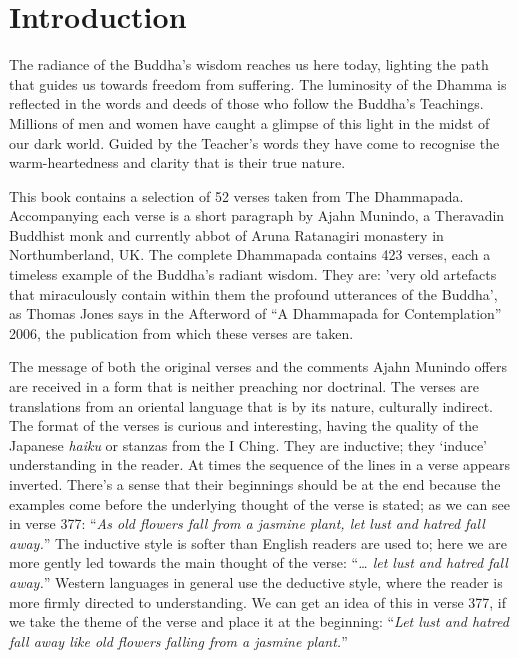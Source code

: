 
\chapter{Introduction}

The radiance of the Buddha's wisdom reaches us here today, lighting the
path that guides us towards freedom from suffering. The luminosity of
the Dhamma is reflected in the words and deeds of those who follow the
Buddha's Teachings. Millions of men and women have caught a glimpse of
this light in the midst of our dark world. Guided by the Teacher's words
they have come to recognise the warm-heartedness and clarity that is
their true nature.

This book contains a selection of 52 verses taken from The Dhammapada.
Accompanying each verse is a short paragraph by Ajahn Munindo, a
Theravadin Buddhist monk and currently abbot of Aruna Ratanagiri
monastery in Northumberland, UK. The complete Dhammapada contains 423
verses, each a timeless example of the Buddha's radiant wisdom. They
are: 'very old artefacts that miraculously contain within them the
profound utterances of the Buddha', as Thomas Jones says in the
Afterword of ``A Dhammapada for Contemplation'' 2006, the publication
from which these verses are taken.

The message of both the original verses and the comments Ajahn Munindo
offers are received in a form that is neither preaching nor doctrinal.
The verses are translations from an oriental language that is by its
nature, culturally indirect. The format of the verses is curious and
interesting, having the quality of the Japanese \emph{haiku} or stanzas from
the I Ching. They are inductive; they `induce' understanding in the
reader. At times the sequence of the lines in a verse appears inverted.
There's a sense that their beginnings should be at the end because the
examples come before the underlying thought of the verse is stated; as
we can see in verse 377: ``\emph{As old flowers fall from a jasmine plant, let
lust and hatred fall away.}'' The inductive style is softer than English
readers are used to; here we are more gently led towards the main
thought of the verse: ``\emph{\ldots{} let lust and hatred fall away.}'' Western
languages in general use the deductive style, where the reader is more
firmly directed to understanding. We can get an idea of this in verse
377, if we take the theme of the verse and place it at the beginning:
``\emph{Let lust and hatred fall away like old flowers falling from a jasmine
plant.}''


